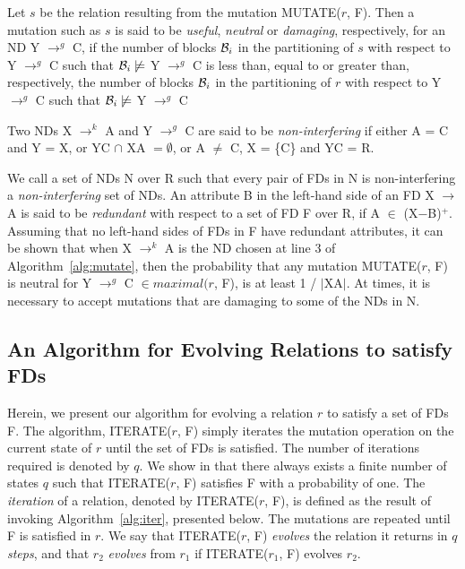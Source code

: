\begin{definition}
\begin{rm}
Let $s$ be the relation resulting from the mutation MUTATE($r$, F).
Then a mutation such as $s$ is said to be {\em useful}, {\em neutral} or 
{\em damaging}, respectively, for an ND Y $\to^g$ C,
if the number of blocks ${\cal B}_i$
in the partitioning of $s$ with respect to Y $\to^g$ C
such that ${\cal B}_i \not\models$ Y $\to^g$ C
is less than, equal to or greater than, respectively, 
the number of blocks ${\cal B}_i$ 
in the partitioning of $r$ with respect to Y $\to^g$ C
such that ${\cal B}_i \not\models$ Y $\to^g$ C
\end{rm}
\end{definition}


\begin{definition}
\begin{rm}
Two NDs X $\to^k$ A and Y $\to^g$ C are said to be {\em non-interfering} if 
either A = C and Y = X, or YC $\cap$ XA $= \emptyset$, 
or A $\not=$ C, X = \{C\} and YC = R.
\end{rm}
\end{definition}
\medskip

We call a set of NDs N over R such that every pair of FDs in N is
non-interfering a {\em non-interfering} set of NDs.
An attribute B in the left-hand side of an FD X $\to$ A is said to be 
{\em redundant} with respect to a set of FD F over R, if A $\in$ (X$-$B)${}^+$.
Assuming that no left-hand sides of FDs in F have redundant attributes,
it can be shown that when X $\to^k$ A is the ND chosen at line 3 of 
Algorithm~\ref{alg:mutate}, then the probability that any mutation MUTATE($r$, F)
is neutral for Y $\to^g$ C $\in maximal(r$, F), is at least 1 / $\mid$XA$\mid$.
At times, it is necessary to accept mutations that are damaging 
to some of the NDs in N. 

\subsection{An Algorithm for Evolving Relations to satisfy FDs}
\label{sec:evolve}


Herein, we present our algorithm for evolving a relation $r$ to satisfy a set
of FDs F. The algorithm, ITERATE($r$, F) simply iterates 
the mutation operation on the current state of $r$ until the set of
FDs is satisfied. The number of iterations required is denoted by $q$.
We show in \cite{cl96} that there always exists a finite number of states $q$
such that ITERATE($r$, F) satisfies F with a probability of one.
The {\em iteration} of a relation, denoted by ITERATE($r$, F),
is defined as the result of invoking Algorithm~\ref{alg:iter},
presented below. The mutations are repeated until F is satisfied in $r$.
We say that ITERATE($r$, F) {\em evolves} the relation it returns
in $q$ {\em steps}, and that $r_2$ {\em evolves} from $r_1$
if ITERATE($r_1$, F) evolves $r_2$.

